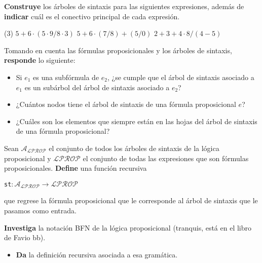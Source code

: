 \documentclass[oneside]{style}
\begin{document}
\begin{questions}[label=\protect\circled{\bfseries\arabic*}]
    \question
    {
        \textbf{Construye} los árboles de sintaxis para las siguientes 
        expresiones, además de \textbf{indicar} cuál es el conectivo principal 
        de cada expresión. 
        \begin{tasks}(3)
            \task $5 + 6 \cdot (5 \cdot 9 / 8 \cdot 3)$
            \task $5 + 6 \cdot (7/ 8) + (5 / 0)$
            \task $2 + 3 + 4 \cdot 8 / (4 - 5)$
        \end{tasks}
    }

    \question
    {
        Tomando en cuenta las fórmulas proposicionales y los árboles de 
        sintaxis, \textbf{responde} lo siguiente:
        \begin{itemize}
            \item Si $e_1$ es una subfórmula de $e_2$, ¿se cumple que 
            el árbol de sintaxis asociado a $e_1$ es un subárbol del árbol 
            de sintaxis asociado a $e_2$?

            \item ¿Cuántos nodos tiene el árbol de sintaxis de una fórmula 
            proposicional $e$?

            \item ¿Cuáles son los elementos que siempre están en las hojas 
            del árbol de sintaxis de una fórmula proposicional?
        \end{itemize}
    }

    \question
    {
        Sean $\mathcal{A}_{\mathcal{LPROP}}$ el conjunto de todos los árboles 
        de sintaxis de la lógica proposicional y $\mathcal{LPROP}$ el 
        conjunto de todas las expresiones que son fórmulas proposicionales. 
        \textbf{Define} una función recursiva 
        \begin{center}
            \texttt{st}$: \mathcal{A}_{\mathcal{LPROP}} \rightarrow
            \mathcal{LPROP}$
        \end{center}

        que regrese la fórmula proposicional que le corresponde al árbol de 
        sintaxis que le pasamos como entrada.  
    }

    \question
    {
        \textbf{Investiga} la notación BFN de la lógica proposicional 
        (tranquis, está en el libro de Favio bb). 
        \begin{itemize}
            \item \textbf{Da} la definición recursiva asociada a esa 
            gramática. 


\end{itemize}}
\end{questions}
\end{document}

